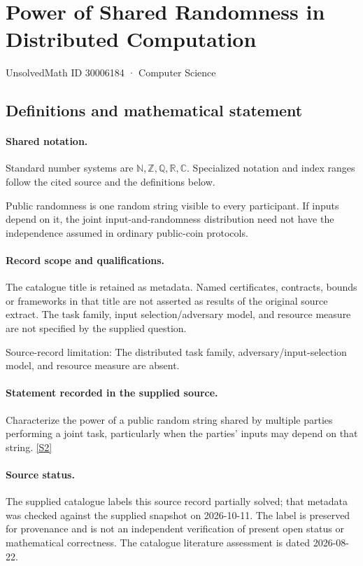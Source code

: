 \documentclass[11pt]{article}
\newcommand{\sref}[2]{\hyperlink{source:#1:#2}{[S#2]}}
\begin{document}
\setcounter{section}{30006183}
\section{Power of Shared Randomness in Distributed Computation}\label{30006184}
{\small\sffamily UnsolvedMath ID 30006184 · Computer Science}
\subsection{Definitions and mathematical statement}

\paragraph{Shared notation.}Standard number systems are $\mathbb N,\mathbb Z,\mathbb Q,\mathbb R,\mathbb C$. Specialized notation and index ranges follow the cited source and the definitions below.


Public randomness is one random string visible to every participant. If inputs depend on it, the joint input-and-randomness distribution need not have the independence assumed in ordinary public-coin protocols.
\paragraph{Record scope and qualifications.}
The catalogue title is retained as metadata. Named certificates, contracts, bounds or frameworks in that title are not asserted as results of the original source extract.
The task family, input selection/adversary model, and resource measure are not specified by the supplied question.

Source-record limitation: The distributed task family, adversary/input-selection model, and resource measure are absent.
\paragraph{Statement recorded in the supplied source.}
Characterize the power of a public random string shared by multiple parties performing a joint task, particularly when the parties' inputs may depend on that string. \sref{30006184}{2}
\paragraph{Source status.}
The supplied catalogue labels this source record partially solved; that metadata was checked against the supplied snapshot on 2026-10-11. The label is preserved for provenance and is not an independent verification of present open status or mathematical correctness. The catalogue literature assessment is dated 2026-08-22.
\end{document}
